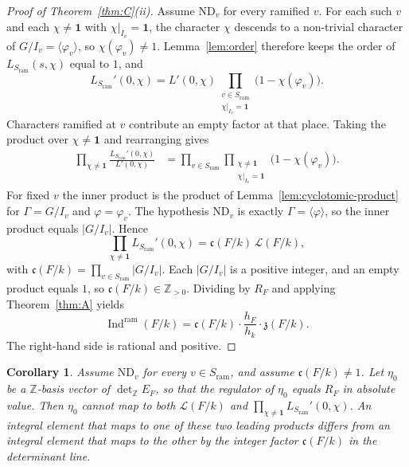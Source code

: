 \documentclass[11pt]{article}
\theoremstyle{plain}
\newtheorem{corollary}[theorem]{Corollary}
\theoremstyle{definition}
\theoremstyle{remark}
\newcommand{\Z}{\mathbb{Z}}
\newcommand{\Ind}{\operatorname{Ind}}
\newcommand{\triv}{\mathbf{1}}
\newcommand{\ram}{\mathrm{ram}}
\begin{document}
\begin{proof}[Proof of Theorem~\ref{thm:C}(ii)]
Assume $\mathrm{ND}_v$ for every ramified $v$.
For each such $v$ and each $\chi\neq\triv$ with $\chi|_{I_v}=\triv$, the character $\chi$ descends to a non-trivial character of $G/I_v=\langle\varphi_v\rangle$, so $\chi(\varphi_v)\neq 1$.
Lemma~\ref{lem:order} therefore keeps the order of $L_{S_{\ram}}(s,\chi)$ equal to $1$, and
\begin{equation}
\label{eq:local-factor}
  L_{S_{\ram}}'(0,\chi)
  =L'(0,\chi)\prod_{\substack{v\in S_{\ram}\\ \chi|_{I_v}=\triv}}\bigl(1-\chi(\varphi_v)\bigr).
\end{equation}
Characters ramified at $v$ contribute an empty factor at that place.
Taking the product over $\chi\neq\triv$ and rearranging gives
\begin{align*}
  \prod_{\chi\neq\triv}\frac{L_{S_{\ram}}'(0,\chi)}{L'(0,\chi)}
  &=\prod_{v\in S_{\ram}}
    \prod_{\substack{\chi\neq\triv\\ \chi|_{I_v}=\triv}}\bigl(1-\chi(\varphi_v)\bigr).
\end{align*}
For fixed $v$ the inner product is the product of Lemma~\ref{lem:cyclotomic-product} for $\Gamma=G/I_v$ and $\varphi=\varphi_v$.
The hypothesis $\mathrm{ND}_v$ is exactly $\Gamma=\langle\varphi\rangle$, so the inner product equals $|G/I_v|$.
Hence
\[
  \prod_{\chi\neq\triv}L_{S_{\ram}}'(0,\chi)
  =\mathfrak{c}(F/k)\,\mathcal{L}(F/k),
\]
with $\mathfrak{c}(F/k)=\prod_{v\in S_{\ram}}|G/I_v|$.
Each $|G/I_v|$ is a positive integer, and an empty product equals $1$, so $\mathfrak{c}(F/k)\in\Z_{>0}$.
Dividing by $R_F$ and applying Theorem~\ref{thm:A} yields
\[
  \Ind^{\ram}(F/k)
  =\mathfrak{c}(F/k)\cdot\frac{h_F}{h_k}\cdot\mathfrak{z}(F/k).
\]
The right-hand side is rational and positive.
\end{proof}

\begin{corollary}
\label{cor:primitive}
Assume $\mathrm{ND}_v$ for every $v\in S_{\ram}$, and assume $\mathfrak{c}(F/k)\neq 1$.
Let $\eta_0$ be a $\Z$-basis vector of $\det_{\Z}E_F$, so that the regulator of $\eta_0$ equals $R_F$ in absolute value.
Then $\eta_0$ cannot map to both $\mathcal{L}(F/k)$ and $\prod_{\chi\neq\triv}L_{S_{\ram}}'(0,\chi)$.
An integral element that maps to one of these two leading products differs from an integral element that maps to the other by the integer factor $\mathfrak{c}(F/k)$ in the determinant line.
\end{corollary}
\end{document}
